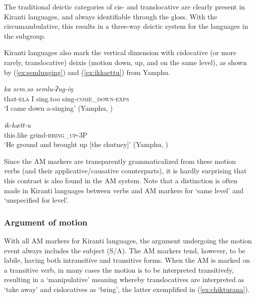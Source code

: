 \documentclass[oneside,a4paper,11pt]{article}
\newcommand{\ipa}[1]{{\phon\textit{#1}}}
\newcommand{\sens}[1]{‘#1’}
\newcommand{\rouge}[1]{{\color{red}#1}}
\begin{document}
The traditional deictic categories of cis- and translocative are clearly present in Kiranti languages, and always identifiable through the gloss.  With the circumambulative, this results in a three-way deictic system for the languages in the subgroup.

Kiranti languages also mark the vertical dimension with cislocative (or more rarely, translocative) deixis (motion down, up, and on the same level), as shown by (\ref{ex:semluuging}) and (\ref{ex:ikkaettu}) from Yamphu.
 
\begin{exe}
\ex \label{ex:semluuging}
 \gll \ipa{mo.ba}	\ipa{ka}	\ipa{sem.so}	\ipa{semlu-\rouge{ʔug}-iŋ} \\
that-\textsc{ela} I sing.too sing-\textsc{\rouge{come\_down}}-\textsc{exps} \\
\glt \sens{I came down a-singing} (Yamphu, \citealt[143]{rutgers98yamphu})
\end{exe}

\begin{exe}
\ex \label{ex:ikkaettu}
 \gll \ipa{i.doʔ}	\ipa{ik-\rouge{kætt}-u} \\
this.like grind-\textsc{\rouge{bring\_up}}-3P \\
\glt \sens{He ground and brought up [the chutney]} (Yamphu, \citealt[144]{rutgers98yamphu})
\end{exe}

 Since the AM markers are transparently grammaticalized from these motion verbs (and their applicative/causative counterparts), it is hardly surprising that this contrast is also found in the AM system.
Note that a distinction is often made in Kiranti languages between verbs and AM markers for `same level' and `unspecified for level'.

 

  \subsubsection{Argument of motion} \label{sec:argument.khaling}
With all AM markers for Kiranti languages, the argument undergoing the motion event always includes the subject (S/A).  The AM markers tend, however, to be labile, having both intransitive and transitive forms.  When the AM is marked on a transitive verb, in many cases the motion is to be interpreted transitively, resulting in a `manipulative' meaning whereby translocatives are interpreted as `take away' and cislocatives as `bring', the latter exemplified in (\ref{ex:chikturana}).
\end{document}
